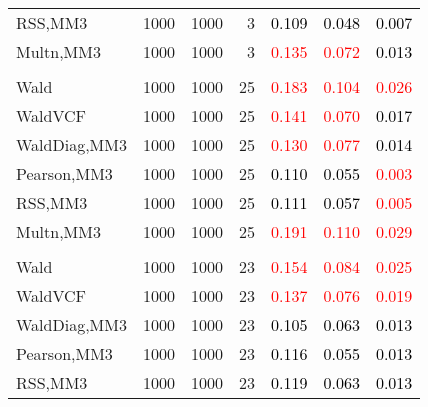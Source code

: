 \documentclass[
]{article}
\begin{document}
\begin{table}[H]
{\begin{tabular}[t]{lrrrrrr}
\hspace{1em}RSS,MM3 & 1000 & 1000 & 3 & \textcolor{black}{0.109} & \textcolor{black}{0.048} & \textcolor{black}{0.007}\\
\hspace{1em}Multn,MM3 & 1000 & 1000 & 3 & \textcolor{red}{0.135} & \textcolor{red}{0.072} & \textcolor{black}{0.013}\\
\addlinespace[0.3em]
\multicolumn{7}{l}{\textbf{1F 15V}}\\
\hspace{1em}Wald & 1000 & 1000 & 25 & \textcolor{red}{0.183} & \textcolor{red}{0.104} & \textcolor{red}{0.026}\\
\hspace{1em}WaldVCF & 1000 & 1000 & 25 & \textcolor{red}{0.141} & \textcolor{red}{0.070} & \textcolor{black}{0.017}\\
\hspace{1em}WaldDiag,MM3 & 1000 & 1000 & 25 & \textcolor{red}{0.130} & \textcolor{red}{0.077} & \textcolor{black}{0.014}\\
\hspace{1em}Pearson,MM3 & 1000 & 1000 & 25 & \textcolor{black}{0.110} & \textcolor{black}{0.055} & \textcolor{red}{0.003}\\
\hspace{1em}RSS,MM3 & 1000 & 1000 & 25 & \textcolor{black}{0.111} & \textcolor{black}{0.057} & \textcolor{red}{0.005}\\
\hspace{1em}Multn,MM3 & 1000 & 1000 & 25 & \textcolor{red}{0.191} & \textcolor{red}{0.110} & \textcolor{red}{0.029}\\
\addlinespace[0.3em]
\multicolumn{7}{l}{\textbf{2F 10V}}\\
\hspace{1em}Wald & 1000 & 1000 & 23 & \textcolor{red}{0.154} & \textcolor{red}{0.084} & \textcolor{red}{0.025}\\
\hspace{1em}WaldVCF & 1000 & 1000 & 23 & \textcolor{red}{0.137} & \textcolor{red}{0.076} & \textcolor{red}{0.019}\\
\hspace{1em}WaldDiag,MM3 & 1000 & 1000 & 23 & \textcolor{black}{0.105} & \textcolor{black}{0.063} & \textcolor{black}{0.013}\\
\hspace{1em}Pearson,MM3 & 1000 & 1000 & 23 & \textcolor{black}{0.116} & \textcolor{black}{0.055} & \textcolor{black}{0.013}\\
\hspace{1em}RSS,MM3 & 1000 & 1000 & 23 & \textcolor{black}{0.119} & \textcolor{black}{0.063} & \textcolor{black}{0.013}\\

\end{tabular}}
\end{table}
\end{document}
